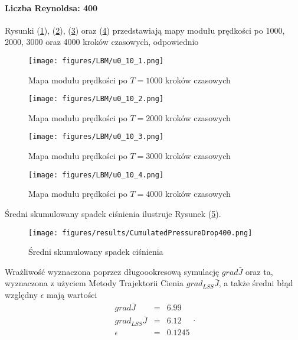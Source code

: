 \documentclass[12pt, twoside]{book}
\begin{document}
\paragraph{Liczba Reynoldsa: 400}
Rysunki (\ref{Fig41}), (\ref{Fig42}), (\ref{Fig43}) oraz (\ref{Fig44}) przedstawiają mapy modułu prędkości po 1000, 2000, 3000 oraz 4000 kroków czasowych, odpowiednio 
\begin{figure}[H]
	\texttt{[image: figures/LBM/u0\_10\_1.png]} 
	\caption{Mapa modułu prędkości po $ T=1000 $ kroków czasowych}
	\label{Fig41}
\end{figure}
\begin{figure}[H]
	\texttt{[image: figures/LBM/u0\_10\_2.png]} 
	\caption{Mapa modułu prędkości po $ T=2000 $ kroków czasowych}
	\label{Fig42}
\end{figure}
\begin{figure}[H]
	\texttt{[image: figures/LBM/u0\_10\_3.png]} 
	\caption{Mapa modułu prędkości po $ T=3000 $ kroków czasowych}
	\label{Fig43}
\end{figure}
\begin{figure}[H]
	\texttt{[image: figures/LBM/u0\_10\_4.png]} 
	\caption{Mapa modułu prędkości po $ T=4000 $ kroków czasowych}
	\label{Fig44}
\end{figure}
Średni skumulowany spadek ciśnienia ilustruje Rysunek (\ref{Fig45}).
\begin{figure}[H]
	\texttt{[image: figures/results/CumulatedPressureDrop400.png]} 
	\centering
	\caption{Średni skumulowany spadek ciśnienia}
	\label{Fig45}
\end{figure}
Wrażliwość wyznaczona poprzez długoookresową symulację $ grad\bar{J} $ oraz ta, wyznaczona z użyciem Metody Trajektorii Cienia $ grad_{LSS}\bar{J} $, a także średni błąd względny $ \epsilon $ mają wartości
\begin{equation}
\begin{array}{rcl}
grad\bar{J} &=& 6.99 \\
grad_{LSS}\bar{J} &=& 6.12 \\
\epsilon &=& 0.1245
\end{array} .
\label{result400}
\end{equation}
\end{document}
